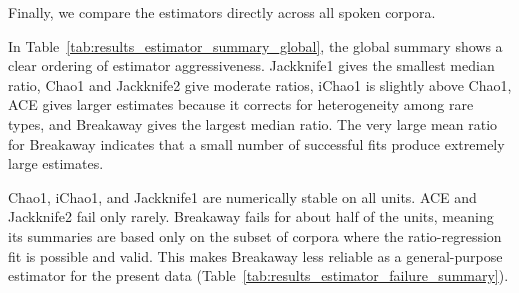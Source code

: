 ﻿\documentclass{article}
\begin{document}
Finally, we compare the estimators directly across all spoken corpora.

\begin{table}[htbp]
    \centering
    \caption{Global estimator behavior across all spoken corpora. Ratios are $\hat{S}/S_{\mathrm{obs}}$.}
    \label{tab:results_estimator_summary_global}
\end{table}

In Table~\ref{tab:results_estimator_summary_global}, the global summary shows a clear ordering of estimator aggressiveness. Jackknife1 gives the smallest median ratio, Chao1 and Jackknife2 give moderate ratios, iChao1 is slightly above Chao1, ACE gives larger estimates because it corrects for heterogeneity among rare types, and Breakaway gives the largest median ratio. The very large mean ratio for Breakaway indicates that a small number of successful fits produce extremely large estimates.

Chao1, iChao1, and Jackknife1 are numerically stable on all units. ACE and Jackknife2 fail only rarely. Breakaway fails for about half of the units, meaning its summaries are based only on the subset of corpora where the ratio-regression fit is possible and valid. This makes Breakaway less reliable as a general-purpose estimator for the present data (Table~\ref{tab:results_estimator_failure_summary}).
\end{document}

